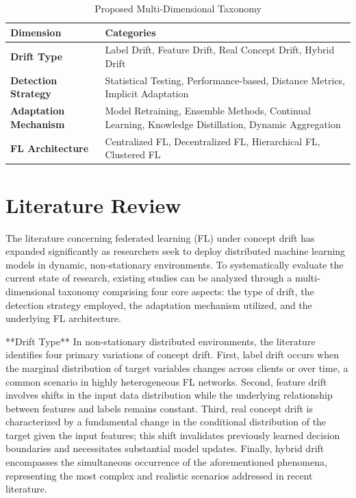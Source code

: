 \documentclass[journal]{IEEEtran}
\begin{document}
\begin{table}[!t]
\renewcommand{\arraystretch}{1.3}
\caption{Proposed Multi-Dimensional Taxonomy}
\label{tab:taxonomy}
\centering
\begin{tabular}{p{3cm}p{9cm}}
\toprule
\textbf{Dimension} & \textbf{Categories} \\
\midrule
\textbf{Drift Type} & Label Drift, Feature Drift, Real Concept Drift, Hybrid Drift \\
\textbf{Detection Strategy} & Statistical Testing, Performance-based, Distance Metrics, Implicit Adaptation \\
\textbf{Adaptation Mechanism} & Model Retraining, Ensemble Methods, Continual Learning, Knowledge Distillation, Dynamic Aggregation \\
\textbf{FL Architecture} & Centralized FL, Decentralized FL, Hierarchical FL, Clustered FL \\
\bottomrule
\end{tabular}
\end{table}

\section{Literature Review}
\label{sec:literature_review}

The literature concerning federated learning (FL) under concept drift has expanded significantly as researchers seek to deploy distributed machine learning models in dynamic, non-stationary environments. To systematically evaluate the current state of research, existing studies can be analyzed through a multi-dimensional taxonomy comprising four core aspects: the type of drift, the detection strategy employed, the adaptation mechanism utilized, and the underlying FL architecture.

**Drift Type**
In non-stationary distributed environments, the literature identifies four primary variations of concept drift. First, label drift occurs when the marginal distribution of target variables changes across clients or over time, a common scenario in highly heterogeneous FL networks. Second, feature drift involves shifts in the input data distribution while the underlying relationship between features and labels remains constant. Third, real concept drift is characterized by a fundamental change in the conditional distribution of the target given the input features; this shift invalidates previously learned decision boundaries and necessitates substantial model updates. Finally, hybrid drift encompasses the simultaneous occurrence of the aforementioned phenomena, representing the most complex and realistic scenarios addressed in recent literature.
\end{document}
